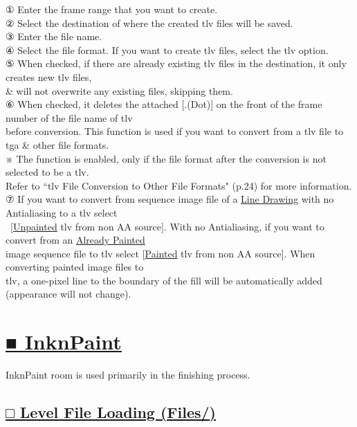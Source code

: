 \documentclass[a4paper,10pt]{article}
\begin{document}
\small
\noindent ① Enter the frame range that you want to create.\\
② Select the destination of where the created tlv files will be saved.\\
③ Enter the file name.\\
④ Select the file format. If you want to create tlv files, select the tlv option.\\
⑤ When checked, if there are already existing tlv files in the destination, it only creates new tlv files,\\
\& will not overwrite any existing files, skipping them.\\
⑥ When checked, it deletes the attached [.(Dot)] on the front of the frame number of the file name of tlv\\
before conversion. This function is used if you want to convert from a tlv file to tga \& other file formats.\\
※ The function is enabled, only if the file format after the conversion is not selected to be a tlv.\\
Refer to “tlv File Conversion to Other File Formats" (p.24) for more information.\\
⑦ If you want to convert from sequence image file of a \uline{Line Drawing} with no Antialiasing to a tlv select\\
\ [\uline{Unpainted} tlv from non AA source]. With no Antialiasing, if you want to convert from an \uline{Already Painted}\\
image sequence file to tlv select [\uline{Painted} tlv from non AA source]. When converting painted image files to\\
tlv, a one-pixel line to the boundary of the fill will be automatically added (appearance will not change).

\newpage

\section*{\uline{■ InknPaint}}

\noindent InknPaint room is used primarily in the finishing process.\\[-0.3em]

\subsection*{\uline{□ Level File Loading (Files/)}}
\end{document}

